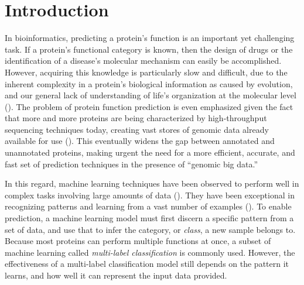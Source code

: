 %
%
%
%
%

\chapter{Introduction}
\label{Introduction}

\par In bioinformatics, predicting a protein's function is an important yet
challenging task. If a protein's functional category is known, then the design
of drugs or the identification of a disease's molecular mechanism can easily be
accomplished. However, acquiring this knowledge is particularly slow and
difficult, due to the inherent complexity in a protein's biological
information as caused by evolution, and our general lack of understanding
of life's organization at the molecular level (\cite{baldi2001bioinformatics}).
The problem of protein function prediction is even emphasized given the fact that more 
and more proteins are being characterized by high-throughput sequencing techniques 
today, creating vast stores of genomic data already available for use
(\cite{gaudet2017gene, cozzetto2017computational}). This eventually widens
the gap between annotated and unannotated proteins, making urgent the need for a
more efficient, accurate, and fast set of prediction techniques in the presence of
``genomic big data.''

\par In this regard, machine learning techniques have been observed to perform
well in complex tasks involving large amounts of data (\cite{chen2014data}).
They have been exceptional in recognizing patterns and learning from
a vast number of examples (\cite{lecun2015deep}). To enable prediction, a
machine learning model must first discern a specific pattern from a set of
data, and use that to infer the category, or \textit{class}, a new sample belongs
to. Because most proteins can perform multiple functions at once, a subset of
machine learning called \textit{multi-label classification} is commonly used.
However, the effectiveness of a multi-label classification model still depends on
the pattern it learns, and how well it can represent the input data provided.

